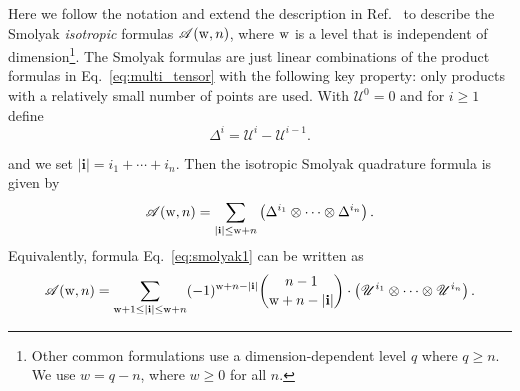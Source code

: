 Here we follow the notation and extend the description in
Ref.~\cite{webster1} to describe the Smolyak {\it isotropic} formulas
$\mathscr{A}({\rm w},n)$, where ${\rm w}$ is a level that is independent of
dimension\footnote{Other common formulations use a dimension-dependent
level $q$ where $q \geq n$.  We use $w = q - n$, where $w \geq 0$ for
all $n$.}.  The Smolyak formulas are just linear combinations of the
product formulas in Eq.~\ref{eq:multi_tensor} with the following key
property: only products with a relatively small number of points are
used.  With $\mathscr{U}^0 = 0$ and for $i \geq 1$ define
%
\begin{equation}\label{eq:delta}
\Delta^i = \mathscr{U}^i-\mathscr{U}^{i-1}.
\end{equation}
%

and we set $|\mathbf{i}| = i_1+\cdots + i_n$.
Then the isotropic Smolyak quadrature formula is given by
%
\begin{equation}\label{eq:smolyak1}
\mathscr{A}({\rm w},n) = \sum_{|\mathbf{i}| \leq {\rm w}+n}\left(\Delta^{i_1}\otimes\cdots\otimes\Delta^{i_n}\right).
\end{equation}
%
Equivalently, formula Eq.~\ref{eq:smolyak1} can be written as~\cite{was_woz}
%
\begin{equation}\label{eq:smolyak2}
\mathscr{A}({\rm w},n) = \sum_{{\rm w}+1 \leq |\mathbf{i}| \leq {\rm w}+n}(-1)^{{\rm w}+n-|\mathbf{i}|}
{n-1 \choose {\rm w}+n-|\mathbf{i}|}\cdot
\left(\mathscr{U}^{i_1}\otimes\cdots\otimes\mathscr{U}^{i_n}\right).
\end{equation}


